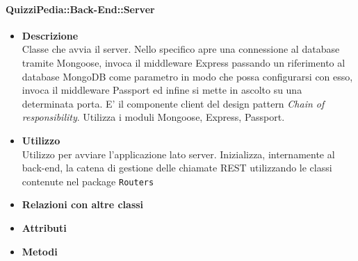 	\paragraph{QuizziPedia::Back-End::Server}
	\begin{itemize}
		\item \textbf{Descrizione} \\
		Classe che avvia il server. Nello specifico apre una connessione al database tramite Mongoose, invoca il middleware Express passando un riferimento al database MongoDB come parametro in modo  che possa configurarsi con esso, invoca il middleware Passport ed infine si mette in ascolto su una determinata porta. E' il componente client del design pattern \textit{Chain of responsibility}. Utilizza i moduli Mongoose, Express, Passport.
		\item \textbf{Utilizzo} \\
		Utilizzo per avviare l'applicazione lato server. Inizializza, internamente al back-end, la catena di gestione delle chiamate REST utilizzando le classi contenute nel package \texttt{Routers}
		\item \textbf{Relazioni con altre classi}
		\item \textbf{Attributi}
		\item \textbf{Metodi}
	\end{itemize}
	
